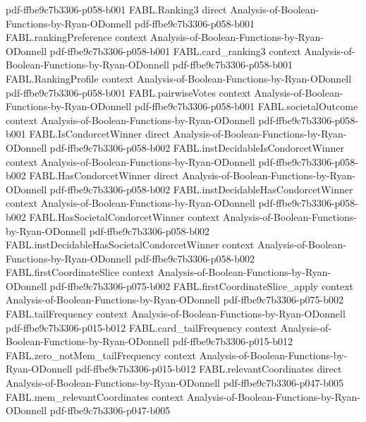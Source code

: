 \begin{theorem}
  {pdf-ffbe9c7b3306-p058-b001}
\proofstep
  {FABL.Ranking3}
  {direct}
  {Analysis-of-Boolean-Functions-by-Ryan-ODonnell}
  {pdf-ffbe9c7b3306-p058-b001}
\proofstep
  {FABL.rankingPreference}
  {context}
  {Analysis-of-Boolean-Functions-by-Ryan-ODonnell}
  {pdf-ffbe9c7b3306-p058-b001}
\proofstep
  {FABL.card_ranking3}
  {context}
  {Analysis-of-Boolean-Functions-by-Ryan-ODonnell}
  {pdf-ffbe9c7b3306-p058-b001}
\proofstep
  {FABL.RankingProfile}
  {context}
  {Analysis-of-Boolean-Functions-by-Ryan-ODonnell}
  {pdf-ffbe9c7b3306-p058-b001}
\proofstep
  {FABL.pairwiseVotes}
  {context}
  {Analysis-of-Boolean-Functions-by-Ryan-ODonnell}
  {pdf-ffbe9c7b3306-p058-b001}
\proofstep
  {FABL.societalOutcome}
  {context}
  {Analysis-of-Boolean-Functions-by-Ryan-ODonnell}
  {pdf-ffbe9c7b3306-p058-b001}
\proofstep
  {FABL.IsCondorcetWinner}
  {direct}
  {Analysis-of-Boolean-Functions-by-Ryan-ODonnell}
  {pdf-ffbe9c7b3306-p058-b002}
\proofstep
  {FABL.instDecidableIsCondorcetWinner}
  {context}
  {Analysis-of-Boolean-Functions-by-Ryan-ODonnell}
  {pdf-ffbe9c7b3306-p058-b002}
\proofstep
  {FABL.HasCondorcetWinner}
  {direct}
  {Analysis-of-Boolean-Functions-by-Ryan-ODonnell}
  {pdf-ffbe9c7b3306-p058-b002}
\proofstep
  {FABL.instDecidableHasCondorcetWinner}
  {context}
  {Analysis-of-Boolean-Functions-by-Ryan-ODonnell}
  {pdf-ffbe9c7b3306-p058-b002}
\proofstep
  {FABL.HasSocietalCondorcetWinner}
  {context}
  {Analysis-of-Boolean-Functions-by-Ryan-ODonnell}
  {pdf-ffbe9c7b3306-p058-b002}
\proofstep
  {FABL.instDecidableHasSocietalCondorcetWinner}
  {context}
  {Analysis-of-Boolean-Functions-by-Ryan-ODonnell}
  {pdf-ffbe9c7b3306-p058-b002}
\proofstep
  {FABL.firstCoordinateSlice}
  {context}
  {Analysis-of-Boolean-Functions-by-Ryan-ODonnell}
  {pdf-ffbe9c7b3306-p075-b002}
\proofstep
  {FABL.firstCoordinateSlice_apply}
  {context}
  {Analysis-of-Boolean-Functions-by-Ryan-ODonnell}
  {pdf-ffbe9c7b3306-p075-b002}
\proofstep
  {FABL.tailFrequency}
  {context}
  {Analysis-of-Boolean-Functions-by-Ryan-ODonnell}
  {pdf-ffbe9c7b3306-p015-b012}
\proofstep
  {FABL.card_tailFrequency}
  {context}
  {Analysis-of-Boolean-Functions-by-Ryan-ODonnell}
  {pdf-ffbe9c7b3306-p015-b012}
\proofstep
  {FABL.zero_notMem_tailFrequency}
  {context}
  {Analysis-of-Boolean-Functions-by-Ryan-ODonnell}
  {pdf-ffbe9c7b3306-p015-b012}
\proofstep
  {FABL.relevantCoordinates}
  {direct}
  {Analysis-of-Boolean-Functions-by-Ryan-ODonnell}
  {pdf-ffbe9c7b3306-p047-b005}
\proofstep
  {FABL.mem_relevantCoordinates}
  {context}
  {Analysis-of-Boolean-Functions-by-Ryan-ODonnell}
  {pdf-ffbe9c7b3306-p047-b005}
\proofstep

\end{theorem}
